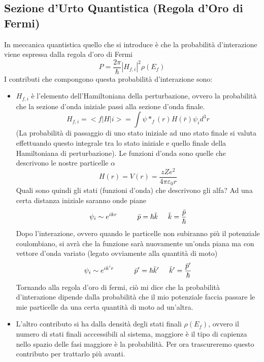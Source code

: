\subsection{Sezione d'Urto Quantistica (Regola d'Oro di Fermi)}
In meccanica quantistica quello che si introduce è che la probabilità d'interazione viene espressa dalla regola d'oro di Fermi
\[P=\frac{2\pi}{\hbar}|H_{f,i}|^2\rho(E_f)\]
I contributi che compongono questa probabilità d'interazione sono:
\begin{itemize}
\item $H_{f,i}$ è l'elemento dell'Hamiltoniana della perturbazione, ovvero la probabilità che la sezione d'onda iniziale passi alla sezione d'onda finale.
\[H_{f,i}=<f|H|i>=\int \psi*_f(r)H(\bar r)\psi_i d^3r\]
(La probabilità di passaggio di uno stato iniziale ad uno stato finale si valuta effettuando questo integrale tra lo stato iniziale e quello finale della Hamiltoniana di perturbazione).
Le funzioni d'onda sono quelle che descrivono le nostre particelle $\alpha$
\[H(r)=V(r)=\frac{zZe^2}{4\pi \varepsilon_0r}\]
Quali sono quindi gli stati (funzioni d'onda) che descrivono gli alfa?
Ad una certa distanza iniziale saranno onde piane
\[\psi_i \sim e^{ikr} \hspace{1cm}\bar p=\hbar\bar k\hspace{0.5cm}\bar k=\frac{\bar p}{\hbar}\]
Dopo l'interazione, ovvero quando le particelle non subiranno più il potenziale coulombiano, si avrà che la funzione sarà nuovamente un'onda piana ma con vettore d'onda variato (legato ovviamente alla quantità di moto)
\[\psi_i \sim e^{ik'r}\hspace{1cm} \bar p'=\hbar\bar k'\hspace{0.5cm}\bar k'=\frac{\bar p'}{\hbar}\]
Tornando alla regola d'oro di fermi, ciò mi dice che la probabilità d'interazione dipende dalla probabilità che il mio potenziale faccia passare le mie particelle da una certa quantità di moto ad un'altra.

\item L'altro contributo si ha dalla densità degli stati finali $\rho(E_f)$, ovvero il numero di stati finali acccessibili al sistema, maggiore è il tipo di capienza nello spazio delle fasi maggiore è la probabilità. Per ora trascureremo questo contributo per trattarlo più avanti.
\end{itemize}

